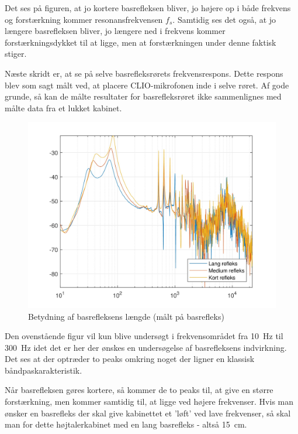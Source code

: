 Det ses på figuren, at jo kortere basrefleksen bliver, jo højere op i både frekvens og forstærkning kommer resonansfrekvensen $f_s$. Samtidig ses det også, at jo længere basrefleksen bliver, jo længere ned i frekvens kommer forstærkningsdykket til at ligge, men at forstærkningen under denne faktisk stiger.

Næste skridt er, at se på selve basrefleksrørets frekvensrespons. Dette respons blev som sagt målt ved, at placere CLIO-mikrofonen inde i selve røret. Af gode grunde, så kan de målte resultater for basrefleksrøret ikke sammenlignes med målte data fra et lukket kabinet.
\begin{figure}[H]
	\centering
	\vspace{-12pt}
	\includegraphics[width=\textwidth]{Billeder/Grafer/BasrefleksLengthTube}
	\caption{Betydning af basrefleksens længde (målt på basrefleks)}
\end{figure}

Den ovenstående figur vil kun blive undersøgt i frekvensområdet fra \SI{10}{\hertz} til \SI{300}{\hertz} idet det er her der ønskes en undersøgelse af basrefleksens indvirkning. Det ses at der optræder to peaks omkring noget der ligner en klassisk båndpaskarakteristik.

Når basrefleksen gøres kortere, så kommer de to peaks til, at give en større forstærkning, men kommer samtidig til, at ligge ved højere frekvenser. Hvis man ønsker en basrefleks der skal give kabinettet et 'løft' ved lave frekvenser, så skal man for dette højtalerkabinet med en lang basrefleks - altså \SI{15}{\centi\meter}.

